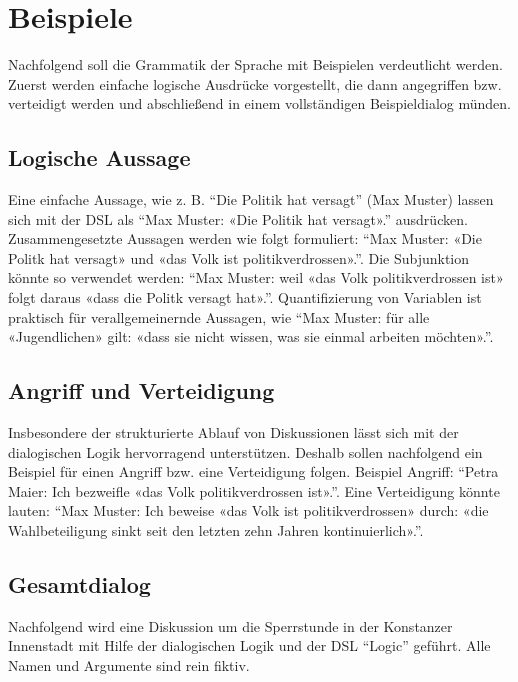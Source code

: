 \documentclass[11pt,a4paper,bibtotocnumbered]{scrreprt}
\begin{document}
\section{Beispiele}

Nachfolgend soll die Grammatik der Sprache mit Beispielen verdeutlicht werden.
Zuerst werden einfache logische Ausdrücke vorgestellt, die dann angegriffen bzw. verteidigt werden und abschließend in einem vollständigen Beispieldialog münden.

\subsection{Logische Aussage}

Eine einfache Aussage, wie z. B. \enquote{Die Politik hat versagt} (Max Muster) lassen sich mit der \ac{DSL} als \enquote{Max Muster: «Die Politik hat versagt».} ausdrücken.
Zusammengesetzte Aussagen werden wie folgt formuliert: \enquote{Max Muster: «Die Politk hat versagt» und «das Volk ist politikverdrossen».}.
Die Subjunktion könnte so verwendet werden: \enquote{Max Muster: weil «das Volk politikverdrossen ist» folgt daraus «dass die Politk versagt hat».}.
Quantifizierung von Variablen ist praktisch für verallgemeinernde Aussagen, wie \enquote{Max Muster: für alle «Jugendlichen» gilt: «dass sie nicht wissen, was sie einmal arbeiten möchten».}.

\subsection{Angriff und Verteidigung}

Insbesondere der strukturierte Ablauf von Diskussionen lässt sich mit der dialogischen Logik hervorragend unterstützen. Deshalb sollen nachfolgend ein Beispiel für einen Angriff bzw. eine Verteidigung folgen.
Beispiel Angriff: \enquote{Petra Maier: Ich bezweifle «das Volk politikverdrossen ist».}.
Eine Verteidigung könnte lauten: \enquote{Max Muster: Ich beweise «das Volk ist politikverdrossen» durch: «die Wahlbeteiligung sinkt seit den letzten zehn Jahren kontinuierlich».}.

\subsection{Gesamtdialog}

Nachfolgend wird eine Diskussion um die Sperrstunde in der Konstanzer Innenstadt mit Hilfe der dialogischen Logik und der \ac{DSL} \enquote{Logic} geführt. 
Alle Namen und Argumente sind rein fiktiv.
\end{document}

